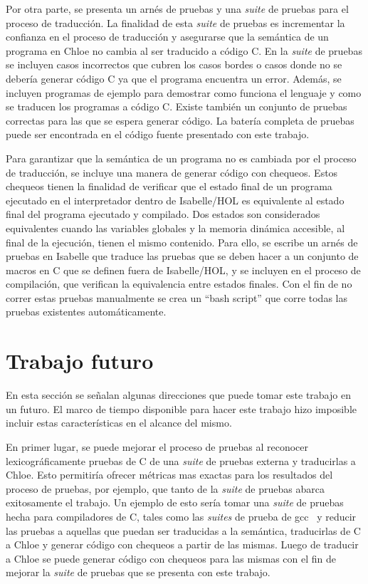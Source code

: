 Por otra parte, se presenta un arnés de pruebas y una \textit{suite} de pruebas para el proceso de traducción.
La finalidad de esta \textit{suite} de pruebas es incrementar la confianza en el proceso de traducción y asegurarse que la semántica de un programa en Chloe no cambia al ser traducido a código C.
En la \textit{suite} de pruebas se incluyen casos incorrectos que cubren los casos bordes o casos donde no se debería generar código C ya que el programa encuentra un error.
Además, se incluyen programas de ejemplo para demostrar como funciona el lenguaje y como se traducen los programas a código C.
Existe también un conjunto de pruebas correctas para las que se espera generar código.
La batería completa de pruebas puede ser encontrada en el código fuente presentado con este trabajo.

Para garantizar que la semántica de un programa no es cambiada por el proceso de traducción, se incluye una manera de generar código con chequeos.
Estos chequeos tienen la finalidad de verificar que el estado final de un programa ejecutado en el interpretador dentro de Isabelle/HOL es equivalente al estado final del programa ejecutado y compilado.
Dos estados son considerados equivalentes cuando las variables globales y la memoria dinámica accesible, al final de la ejecución, tienen el mismo contenido.
Para ello, se escribe un arnés de pruebas en Isabelle que traduce las pruebas que se deben hacer a un conjunto de macros en C que se definen fuera de Isabelle/HOL, y se incluyen en el proceso de compilación, que verifican la equivalencia entre estados finales.
Con el fin de no correr estas pruebas manualmente se crea un ``bash script'' que corre todas las pruebas existentes automáticamente.

\section{Trabajo futuro}

En esta sección se señalan algunas direcciones que puede tomar este trabajo en un futuro.
El marco de tiempo disponible para hacer este trabajo hizo imposible incluir estas características en el alcance del mismo.

En primer lugar, se puede mejorar el proceso de pruebas al reconocer lexicográficamente pruebas de C de una \textit{suite} de pruebas externa y traducirlas a Chloe.
Esto permitiría ofrecer métricas mas exactas para los resultados del proceso de pruebas, por ejemplo, que tanto de la \textit{suite} de pruebas abarca exitosamente el trabajo.
Un ejemplo de esto sería tomar una \textit{suite} de pruebas hecha para compiladores de C, tales como las \textit{suites} de prueba de gcc~\cite{gcc-tests} y reducir las pruebas a aquellas que puedan ser traducidas a la semántica, traducirlas de C a Chloe y generar código con chequeos a partir de las mismas.
Luego de traducir a Chloe se puede generar código con chequeos para las mismas con el fin de mejorar la \textit{suite} de pruebas que se presenta con este trabajo.

